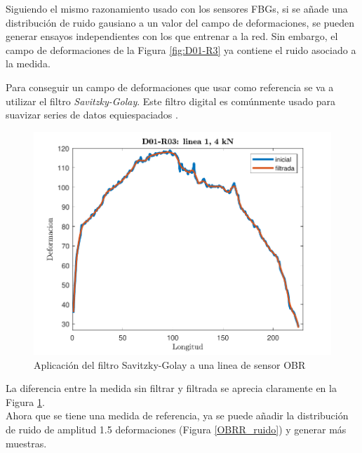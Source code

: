 Siguiendo el mismo razonamiento usado con los sensores FBGs, si se añade una distribución de ruido gausiano a un valor del campo de deformaciones, se pueden generar ensayos independientes con los que entrenar a la red. Sin embargo, el campo de deformaciones de la Figura \ref{fig:D01-R3} ya contiene el ruido asociado a la medida. 

Para conseguir un campo de deformaciones que usar como referencia se va a utilizar el filtro \textit{Savitzky-Golay}. Este filtro digital es comúnmente usado para suavizar series de datos equiespaciados \cite{Savitzky-Golay}.

\begin{figure}[h!]
    \centering
    \includegraphics[width=125mm, angle=0]{3/Fotos/filtro.pdf}
    \captionsetup{justification=centering,margin=1.25cm}
    \caption{Aplicación del filtro Savitzky-Golay a una linea de sensor OBR}
    \label{fig:filtro}
\end{figure}

La diferencia entre la medida sin filtrar y filtrada se aprecia claramente en la Figura \ref{fig:filtro}.\\

Ahora que se tiene una medida de referencia, ya se puede añadir la distribución de ruido de amplitud 1.5 deformaciones (Figura \ref{OBRR_ruido}) y generar más muestras.
    
